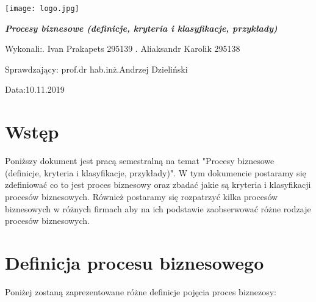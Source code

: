 \documentclass[a4paper, 12pt]{article}
\newcommand{\mainmatter}{\clearpage \cfoot{\thepage\ of \pageref{LastPage}}
\pagenumbering{arabic}}
\begin{document}
	\begin{titlepage}
\texttt{[image: logo.jpg]}
		\begin{center}
    			\vspace{3cm}
    					\Large\textit{\textbf{Procesy biznesowe (definicje, kryteria i klasyfikacje, przykłady)}}
   			\vspace{4cm}
		\end{center} 

		\hfill\begin{minipage}{0.54\textwidth}
			\Large Wykonali:. Ivan Prakapets 295139 . Aliaksandr Karolik 295138
		\vspace{\baselineskip}
		\end{minipage}
		
		\hfill\begin{minipage}{0.54\textwidth}
			\Large Sprawdzający:\newline
		 		prof.dr hab.inż.Andrzej Dzieliński
\vspace{\baselineskip}
		\end{minipage}

		\hfill\begin{minipage}{0.54\textwidth}
			\Large Data:10.11.2019
			\vspace{\baselineskip}
		\end{minipage}
	\end{titlepage}
\newpage
\mainmatter
\setlength{\headheight}{15pt}
\doublespacing
\tableofcontents
\newpage

\linespread{0.5}

\section{Wstęp}
\hspace*{1 cm}Poniższy dokument jest  pracą semestralną na temat "Procesy biznesowe (definicje, kryteria i klasyfikacje, przykłady)". W tym dokumencie postaramy się zdefiniować co to jest proces biznesowy oraz zbadać jakie są kryteria i klasyfikacji procesów biznesowych. Również postaramy się rozpatrzyć kilka procesów biznesowych w różnych firmach aby na ich podstawie zaobserwować różne rodzaje procesów biznesowych. 
\section{Definicja procesu biznesowego}
\hspace*{1 cm}Poniżej zostaną zaprezentowane różne definicje pojęcia proces biznezosy:
\end{document}
